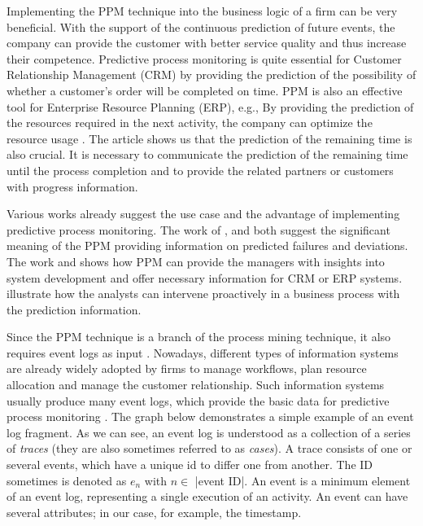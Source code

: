 \documentclass[runningheads]{llncs}
\begin{document}
		Implementing the PPM technique into the business logic of a firm can be very beneficial. With the support of the continuous prediction of future events, the company can provide the customer with better service quality and thus increase their competence. Predictive process monitoring is quite essential for Customer Relationship Management (CRM) by providing the prediction of the possibility of whether a customer's order will be completed on time. PPM is also an effective tool for Enterprise Resource Planning (ERP), e.g., By providing the prediction of the resources required in the next activity, the company can optimize the resource usage \cite{art-13}. The article \cite{art-29} shows us that the prediction of the remaining time is also crucial. It is necessary to communicate the prediction of the remaining time until the process completion and to provide the related partners or customers with progress information.   
		
		Various works already suggest the use case and the advantage of implementing predictive process monitoring. The work of \cite{art-6}, and \cite{art-7} both suggest the significant meaning of the PPM providing information on predicted failures and deviations. The work \cite{art-13} and \cite{art-24} shows how PPM can provide the managers with insights into system development and offer necessary information for CRM or ERP systems. \cite{art-5} illustrate how the analysts can intervene proactively in a business process with the prediction information.
	
		Since the PPM technique is a branch of the process mining technique, it also requires event logs as input \cite{art-15}. Nowadays, different types of information systems are already widely adopted by firms to manage workflows, plan resource allocation and manage the customer relationship. Such information systems usually produce many event logs, which provide the basic data for predictive process monitoring \cite{art-5}. The graph below demonstrates a simple example of an event log fragment. As we can see, an event log is understood as a collection of a series of \textit{traces} (they are also sometimes referred to as \textit{cases}). A trace consists of one or several events, which have a unique id to differ one from another. The ID sometimes is denoted as $ e_{n} $ with $ n \in$ |event ID|. An event is a minimum element of an event log, representing a single execution of an activity. An event can have several attributes; in our case, for example, the timestamp. 
		
\end{document}
